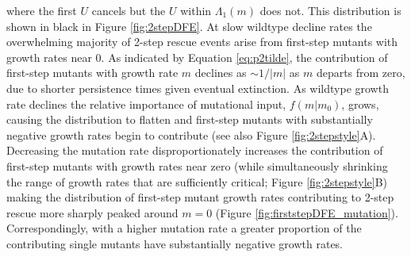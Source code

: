 \documentclass[9pt,twocolumn,twoside,lineno]{gsajnl}
\begin{document}
\noindent where the first $U$ cancels but the $U$ within $\Lambda_{1}(m)$ does not.
This distribution is shown in black in Figure \ref{fig:2stepDFE}.
At slow wildtype decline rates the overwhelming majority of 2-step rescue events arise from first-step mutants with growth rates near 0.
As indicated by Equation \ref{eq:p2tilde}, the contribution of first-step mutants with growth rate $m$ declines as $\sim1/|m|$ as $m$ departs from zero, due to shorter persistence times given eventual extinction.
As wildtype growth rate declines the relative importance of mutational input, $f(m|m_0)$, grows, causing the distribution to flatten and first-step mutants with substantially negative growth rates begin to contribute (see also Figure \ref{fig:2stepstyle}A).
Decreasing the mutation rate disproportionately increases the contribution of first-step mutants with growth rates near zero (while simultaneously shrinking the range of growth rates that are sufficiently critical; Figure \ref{fig:2stepstyle}B) making the distribution of first-step mutant growth rates contributing to 2-step rescue more sharply peaked around $m=0$ (Figure \ref{fig:firststepDFE_mutation}).
Correspondingly, with a higher mutation rate a greater proportion of the contributing single mutants have substantially negative growth rates.
\end{document}
